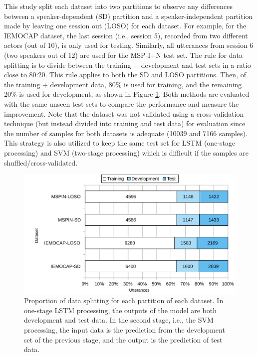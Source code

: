 This study split each dataset into two partitions to observe any differences
between a speaker-dependent (SD) partition and a speaker-independent partition
made by leaving one session out (LOSO) for each dataset. For example, for the
IEMOCAP dataset, the last session (i.e., session 5), recorded from two
different actors (out of 10), is only used for testing. Similarly, all
utterances from session 6 (two speakers out of 12) are used for the MSP-I+N
test set.  The rule for data splitting is to divide between the training +
development and test sets in a ratio close to 80:20. This rule applies to both
the SD and LOSO partitions. Then, of the training + development data, 80\% is
used for training, and the remaining 20\% is used for development, as shown in
Figure \ref{fig:data_partition}. Both methods are evaluated with the same
unseen test sets to compare the performance and measure the improvement. Note
that the dataset was not validated using a cross-validation technique (but
instead divided into training and test data) for evaluation since the number of
samples for both datasets is adequate (10039 and 7166 samples). This strategy
is also utilized to keep the same test set for LSTM (one-stage processing) and
SVM (two-stage processing) which is difficult if the samples are
shuffled/cross-validated.

\begin{figure}
\includegraphics[width=6in]{../fig/csl_partition.pdf}
\caption{Proportion of data splitting for each partition of each dataset. In
one-stage LSTM processing, the outputs of the model are both development and
test data. In the second stage, i.e., the SVM processing, the input data is the
prediction from the development set of the previous stage, and the output is
the prediction of test data.}
\label{fig:data_partition}
\end{figure}

